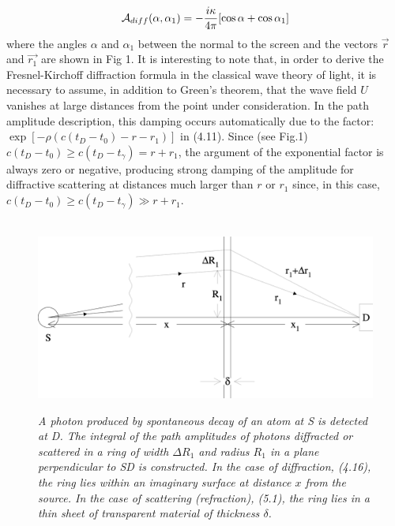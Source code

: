 \documentclass [12pt]{article}
\begin{document}
{\begin{equation}
  {\cal A}_{diff}(\alpha, \alpha_1) = -\frac{i \kappa}{4 \pi}[\cos \alpha+ \cos\alpha_1]
 \end{equation} 
  where the angles $\alpha$ and $\alpha_1$ between the normal to the screen and the vectors
  $\vec{r}$ and  $\vec{r_1}$ are shown in Fig 1. It is interesting to note that, in order to 
   derive the  Fresnel-Kirchoff diffraction formula in the classical wave theory of light, it is
   necessary to assume, in addition to Green's theorem, that the wave field $U$ vanishes at
   large distances from the point under consideration. In the path amplitude description, this
    damping occurs automatically due to the factor: $\exp[-\rho(c(t_D-t_0)-r-r_1)]$ in (4.11).
     Since (see Fig.1) $c(t_D-t_0) \ge c(t_D-t_{\gamma})=r+r_1$, the argument of the exponential factor is 
    always zero or negative, producing strong damping of the amplitude for diffractive scattering
      at distances much larger than $r$ or $r_1$ since, in this case, $c(t_D-t_0) \ge c(t_D-t_{\gamma})
       \gg  r+r_1$. 

\begin{figure}[htbp]
\begin{center}
\hspace*{-0.5cm}\mbox{
\includegraphics[width=5in]{poptf2c.eps}}
\caption{{\sl A photon produced by spontaneous decay of an atom at S is detected
  at D. The integral of the path amplitudes of photons diffracted or scattered in a ring
 of width $\Delta R_1$ and radius $R_1$ in a plane perpendicular to SD is constructed.
 In the case of diffraction, (4.16), the ring lies within an imaginary surface at distance $x$
  from the source. In the case of scattering (refraction), (5.1), the ring lies in a thin
  sheet of transparent material of thickness $\delta$.}} 
\label{fig-fig2}
\end{center}
\end{figure}
  
}
\end{document}
